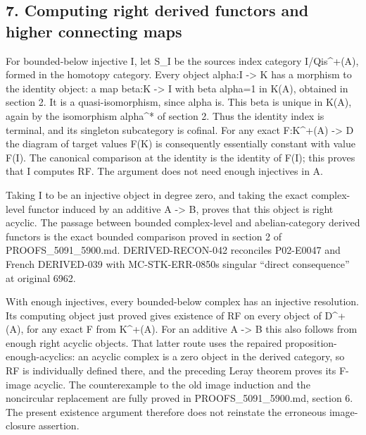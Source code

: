 \documentclass[11pt]{article}
\begin{document}
\subsection{7. Computing right derived functors and higher connecting maps}\label{proofs-6209-7089-computing-right-derived-functors-and-higher-connecting-maps}

For bounded-below injective I,\allowbreak{} let S\_\allowbreak{}I be the source\textquotesingle s index category I/\allowbreak{}Qis\textasciicircum{}\allowbreak{}+(A)\allowbreak{},\allowbreak{} formed in the homotopy category. Every object alpha:\allowbreak{}I \allowbreak{}-> K has a morphism to the identity object:\allowbreak{} a map beta:\allowbreak{}K \allowbreak{}-> I with beta alpha\allowbreak{}=1 in K(A)\allowbreak{},\allowbreak{} obtained in section 2. It is a quasi-isomorphism,\allowbreak{} since alpha is. This beta is unique in K(A)\allowbreak{},\allowbreak{} again by the isomorphism alpha\^{}* of section 2. Thus the identity index is terminal,\allowbreak{} and its singleton subcategory is cofinal. For any exact F:\allowbreak{}K\textasciicircum{}\allowbreak{}+(A)\allowbreak{} \allowbreak{}-> D the diagram of target values F(K)\allowbreak{} is consequently essentially constant with value F(I)\allowbreak{}. The canonical comparison at the identity is the identity of F(I)\allowbreak{}; this proves that I computes RF. The argument does not need enough injectives in A.

Taking I to be an injective object in degree zero,\allowbreak{} and taking the exact complex-level functor induced by an additive A \allowbreak{}-> B,\allowbreak{} proves that this object is right acyclic. The passage between bounded complex-level and abelian-category derived functors is the exact bounded comparison proved in section 2 of PROOFS\_\allowbreak{}5091\_\allowbreak{}5900.md. DERIVED-RECON-042 reconciles P02-E0047 and French DERIVED-039 with MC-STK-ERR-0850\textquotesingle s singular ``direct consequence'' at original 6962.

With enough injectives,\allowbreak{} every bounded-below complex has an injective resolution. Its computing object just proved gives existence of RF on every object of D\textasciicircum{}\allowbreak{}+(A)\allowbreak{},\allowbreak{} for any exact F from K\textasciicircum{}\allowbreak{}+(A)\allowbreak{}. For an additive A \allowbreak{}-> B this also follows from enough right acyclic objects. That latter route uses the repaired proposition-enough-acyclics:\allowbreak{} an acyclic complex is a zero object in the derived category,\allowbreak{} so RF is individually defined there,\allowbreak{} and the preceding Leray theorem proves its F-image acyclic. The counterexample to the old image induction and the noncircular replacement are fully proved in PROOFS\_\allowbreak{}5091\_\allowbreak{}5900.md,\allowbreak{} section 6. The present existence argument therefore does not reinstate the erroneous image-closure assertion.
\end{document}
